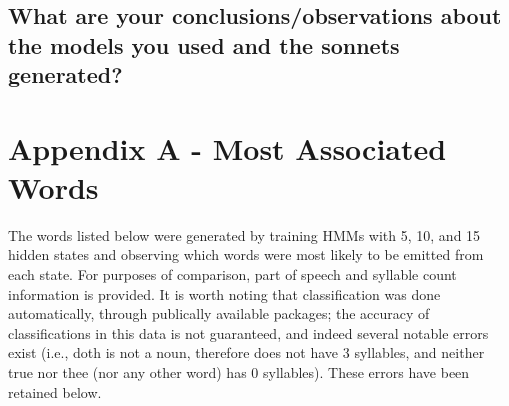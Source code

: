 \subsection{What are your conclusions/observations about the models you used and the sonnets generated?}

\pagebreak
\section{Appendix A - Most Associated Words}
The words listed below were generated by training HMMs with 5, 10, and 15 hidden states and observing which words were most likely to be emitted from each state. For purposes of comparison, part of speech and syllable count information is provided. It is worth noting that classification was done automatically, through publically available packages; the accuracy of classifications in this data is not guaranteed, and indeed several notable errors exist (i.e., doth is not a noun, therefore does not have 3 syllables, and neither true nor thee (nor any other word) has 0 syllables). These errors have been retained below.


